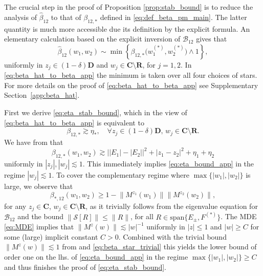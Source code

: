 \documentclass[10pt]{amsart}
\numberwithin{equation}{section}
\newcommand{\R}{\mathbf{R}}
\newcommand{\C}{\mathbf{C}}
\begin{document}
The crucial step in the proof of Proposition \ref{prop:stab_bound} is to reduce the analysis of $\widehat{\beta}_{12}$ to that of $\beta_{12,*}$ defined in \eqref{eq:def_beta_pm_main}. The latter quantity is much more accessible due its definition by the explicit formula. An elementary calculation based on the explicit inversion of $\mathcal{B}_{12}$ gives that
\begin{equation}
\widehat{\beta}_{12}(w_1,w_2)\sim\min\left\lbrace\beta_{12,*}\big(w_1^{(*)}, w_2^{(*)}\big)\wedge 1\right\rbrace,
\label{eq:beta_hat_to_beta_app}
\end{equation}
uniformly in $z_j\in (1-\delta)\mathbf{D}$ and $w_j\in \C\setminus\R$, for $j=1,2$. In \eqref{eq:beta_hat_to_beta_app} the minimum is taken over all four choices of stars. For more details on the proof of \eqref{eq:beta_hat_to_beta_app} see Supplementary Section~\ref{app:beta_hat}.

First we derive \eqref{eq:eta_stab_bound}, which in the view of \eqref{eq:beta_hat_to_beta_app} is equivalent to
\begin{equation}
\beta_{12,*}\gtrsim \eta_*,\quad \forall z_j\in (1-\delta)\mathbf{D},\, w_j\in \C\setminus\R.
\label{eq:eta_bound_app}
\end{equation}
We have from \cite[Lemma 6.1]{macroCLT_real} that
\begin{equation}
\beta_{12,*}(w_1,w_2) \gtrsim \left\vert|E_1|-|E_2|\right\vert^2 +|z_1-z_2|^2 +\eta_1+\eta_2
\label{eq:stab_quad}
\end{equation} 
uniformly in $|z_j|, |w_j|\lesssim 1$. This immediately implies \eqref{eq:eta_bound_app} in the regime $|w_j|\lesssim 1$. To cover the complementary regime where $\max\{|w_1|,|w_2|\}$ is large, we observe that 
\begin{equation}
\beta_{*,12}(w_1,w_2)\ge 1-\lVert M^{z_1}(w_1)\rVert\lVert M^{z_2}(w_2)\rVert,
\label{eq:beta_star_trivial}
\end{equation}
for any $z_j\in \C$, $w_j\in \C\setminus\R$, as it trivially follows from the eigenvalue equation for $\mathcal{B}_{12}$ and the bound $\lVert\mathcal{S}[R]\rVert\le \lVert R\rVert$, for all $R\in\mathrm{span}\{E_\pm, F^{(*)}\}$.  The MDE \eqref{eq:MDE} implies that $\lVert M^{z}(w)\rVert\lesssim |w|^{-1}$ uniformly in $|z|\le 1$ and $|w|\ge C$ for some (large) implicit constant $C>0$. Combined with the trivial bound $\|M^z(w)\|\lesssim 1$ from \cite[Eq.(3.5)]{macroCLT_real} and \eqref{eq:beta_star_trivial} this yields the lower bound of order one on the lhs. of \eqref{eq:eta_bound_app} in the regime $\max\{|w_1|,|w_2|\}\ge C$ and thus finishes the proof of \eqref{eq:eta_stab_bound}.
\end{document}
